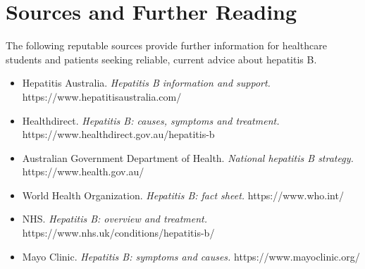 \section*{Sources and Further Reading}
The following reputable sources provide further information for healthcare students and patients seeking reliable, current advice about hepatitis B.

\begin{itemize}
    \item Hepatitis Australia. \textit{Hepatitis B information and support.} https://www.hepatitisaustralia.com/
    \item Healthdirect. \textit{Hepatitis B: causes, symptoms and treatment.} https://www.healthdirect.gov.au/hepatitis-b
    \item Australian Government Department of Health. \textit{National hepatitis B strategy.} https://www.health.gov.au/
    \item World Health Organization. \textit{Hepatitis B: fact sheet.} https://www.who.int/
    \item NHS. \textit{Hepatitis B: overview and treatment.} https://www.nhs.uk/conditions/hepatitis-b/
    \item Mayo Clinic. \textit{Hepatitis B: symptoms and causes.} https://www.mayoclinic.org/
\end{itemize}
